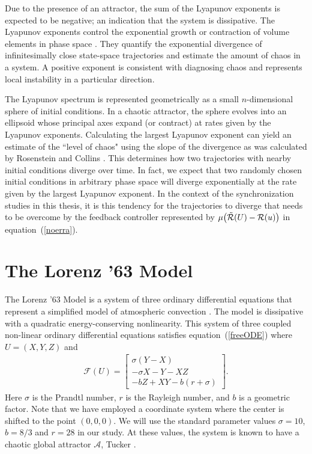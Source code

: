 \documentclass[master,tocprelim,12pt]{unrthesis}
\theoremstyle{definition}
\newcommand{\cF}{{\mathcal F}}
\newcommand{\cA}{{\mathcal A}}
\numberwithin{equation}{chapter}
\begin{document}
\begin{manuscript}
Due to the presence of an attractor, the sum of the Lyapunov
exponents is expected to be negative; an indication that the 
system is dissipative. 
The Lyapunov exponents control the exponential growth or
contraction of volume elements in phase space \cite{Doering95a}.
They 
quantify the exponential divergence of infinitesimally close 
state-space trajectories 
and estimate the amount of chaos in a system. 
A positive exponent is consistent with diagnosing chaos and represents
local instability in a particular direction.

The Lyapunov spectrum is represented geometrically as a small $n$-dimensional 
sphere of initial conditions.
In a chaotic attractor, the sphere evolves into an ellipsoid whose
principal axes expand (or contract) at rates given by the Lyapunov
exponents.
Calculating the largest Lyapunov exponent can yield an estimate 
of the ``level of chaos" using the slope of the divergence
as was calculated by Rosenstein and Collins \cite{Rosenstein93}.
This determines how two trajectories with nearby initial conditions 
diverge over time.
In fact, we expect that two randomly chosen initial 
conditions in arbitrary phase space will diverge exponentially at 
the rate given by the largest Lyapunov exponent. 
In the context of the synchronization studies in this thesis, 
it is this tendency for the
trajectories to diverge that needs to be overcome by the
feedback controller represented by $\mu\big(\tilde{\cal R}(U)-{\cal R}(u)\big)$
in equation~(\ref{noerra}).

\section{The Lorenz '63 Model}

The Lorenz '63 Model is a system of three ordinary differential equations that
represent a simplified model of atmospheric convection \cite{Lorenz63}. 
The model is dissipative with a quadratic energy-conserving nonlinearity.
This system of three coupled non-linear ordinary differential
equations satisfies equation~(\ref{freeODE}) where
$U=(X,Y,Z)$ and
\begin{align}\label{freeLorenz}
    \cF(U)=\begin{bmatrix}\sigma(Y-X)\\
    -\sigma X-Y-XZ\\ -bZ+XY-b(r+\sigma)\end{bmatrix}.
\end{align}
Here $\sigma$ is
the Prandtl number, $r$ is the Rayleigh number, 
and $b$ is a geometric factor. 
Note that we have employed a coordinate system where 
the center is shifted to the point $(0, 0, 0)$.
We will use the standard parameter values 
$\sigma=10$, $b=8/3$ and $r=28$
in our study.  
At these values, the system is known to 
have a chaotic global attractor $\cA$, Tucker \cite{Tucker1999}.


\end{manuscript}
\end{document}

